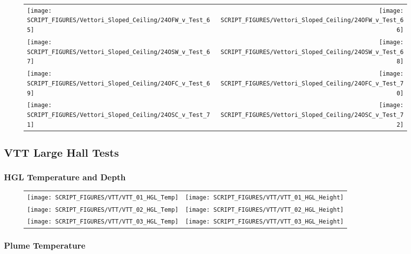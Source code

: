 \begin{figure}[!ht]
\begin{tabular*}{\textwidth}{l@{\extracolsep{\fill}}r}
\texttt{[image: SCRIPT\_FIGURES/Vettori\_Sloped\_Ceiling/24OFW\_v\_Test\_65]} &
\texttt{[image: SCRIPT\_FIGURES/Vettori\_Sloped\_Ceiling/24OFW\_v\_Test\_66]} \\
\texttt{[image: SCRIPT\_FIGURES/Vettori\_Sloped\_Ceiling/24OSW\_v\_Test\_67]} &
\texttt{[image: SCRIPT\_FIGURES/Vettori\_Sloped\_Ceiling/24OSW\_v\_Test\_68]} \\
\texttt{[image: SCRIPT\_FIGURES/Vettori\_Sloped\_Ceiling/24OFC\_v\_Test\_69]} &
\texttt{[image: SCRIPT\_FIGURES/Vettori\_Sloped\_Ceiling/24OFC\_v\_Test\_70]} \\
\texttt{[image: SCRIPT\_FIGURES/Vettori\_Sloped\_Ceiling/24OSC\_v\_Test\_71]} &
\texttt{[image: SCRIPT\_FIGURES/Vettori\_Sloped\_Ceiling/24OSC\_v\_Test\_72]} \\
\end{tabular*}
\label{Vettori_Sloped_9}
\end{figure}

\clearpage

\subsection{VTT Large Hall Tests}

\subsubsection{HGL Temperature and Depth}

\begin{figure}[!ht]
\begin{tabular*}{\textwidth}{l@{\extracolsep{\fill}}r}
\texttt{[image: SCRIPT\_FIGURES/VTT/VTT\_01\_HGL\_Temp]} &
\texttt{[image: SCRIPT\_FIGURES/VTT/VTT\_01\_HGL\_Height]} \\
\texttt{[image: SCRIPT\_FIGURES/VTT/VTT\_02\_HGL\_Temp]} &
\texttt{[image: SCRIPT\_FIGURES/VTT/VTT\_02\_HGL\_Height]} \\
\texttt{[image: SCRIPT\_FIGURES/VTT/VTT\_03\_HGL\_Temp]} &
\texttt{[image: SCRIPT\_FIGURES/VTT/VTT\_03\_HGL\_Height]}
\end{tabular*}
\end{figure}

\clearpage

\subsubsection{Plume Temperature}


